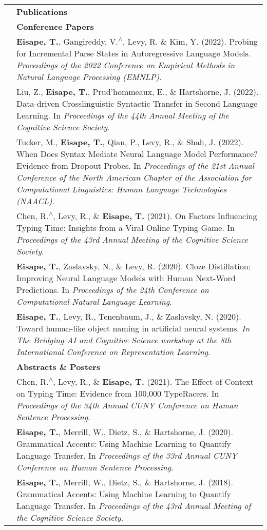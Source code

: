 \documentclass[letterpaper, 11pt]{article}
\newcommand{\headingfont}{\Large\color{Black}}
\newenvironment{SectionTable}[1]{
	\renewcommand*{\arraystretch}{1.7}
	\setlength{\tabcolsep}{10pt}
	\begin{longtable}{Rp{5.2in}} & #1 \\}
{\end{longtable}\vspace{-.3cm}}
\begin{document}
\begin{SectionTable}{\headingfont \textbf{Publications}} 
& \textbf{Conference Papers}\\
& \textbf{Eisape, T.}, Gangireddy, V.\textsuperscript{$\wedge$}, Levy, R. \& Kim, Y. (2022). Probing for Incremental Parse States in Autoregressive Language Models. \textit{Proceedings of the 2022 Conference on Empirical Methods in Natural Language Processing (EMNLP)}.\\
& Liu, Z., \textbf{Eisape, T.}, Prud'hommeaux, E., \& Hartshorne, J.  (2022). Data-driven Crosslinguistic Syntactic Transfer in Second Language Learning. In \textit{Proceedings of the 44th Annual Meeting of the Cognitive Science Society}.\\
 & Tucker, M., \textbf{Eisape, T.}, Qian, P., Levy, R., \&  Shah, J. (2022). When Does Syntax Mediate Neural Language Model Performance? Evidence from Dropout Probes. In \textit{Proceedings of the 21st Annual Conference of the North American Chapter of the Association for Computational Linguistics: Human Language Technologies (NAACL)}.\\
& Chen, R.\textsuperscript{$\wedge$}, Levy, R., \& \textbf{Eisape, T.} (2021). On Factors Influencing Typing Time: Insights from a Viral Online Typing Game. In \textit{Proceedings of the 43rd Annual Meeting of the Cognitive Science Society}.\\
 & \textbf{Eisape, T.}, Zaslavsky, N., \& Levy, R. (2020). Cloze Distillation: Improving Neural Language Models with Human Next-Word Predictions. In \textit{Proceedings of the 24th Conference on Computational Natural Language Learning}.\\
 & \textbf{Eisape, T.}, Levy, R., Tenenbaum, J., \& Zaslavsky, N. (2020). Toward human-like object naming in artificial neural systems. \textit{In The Bridging AI and Cognitive Science workshop at the 8th International Conference on Representation Learning}.\\

 
 & \textbf{Abstracts \& Posters}\\
& Chen, R.\textsuperscript{$\wedge$}, Levy, R., \& \textbf{Eisape, T.} (2021). The Effect of Context on Typing Time: Evidence from 100,000 TypeRacers. In \textit{Proceedings of the 34th Annual CUNY Conference on Human Sentence Processing}.\\
  & \textbf{Eisape, T.}, Merrill, W., Dietz, S., \& Hartshorne, J. (2020). Grammatical Accents: Using Machine Learning to Quantify Language Transfer. In \textit{Proceedings of the 33rd Annual CUNY Conference on Human Sentence Processing}.\\
 & \textbf{Eisape, T.}, Merrill, W., Dietz, S., \& Hartshorne, J. (2018). Grammatical Accents: Using Machine Learning to Quantify Language Transfer. In \textit{Proceedings of the 43rd Annual Meeting of the Cognitive Science Society}.\\


\end{SectionTable}
\end{document}
